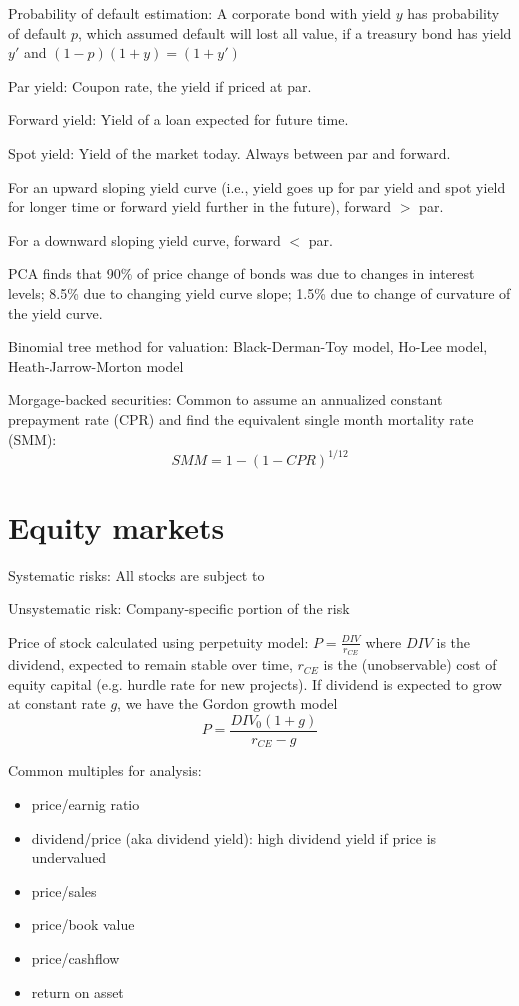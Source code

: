 \documentclass[9pt,twocolumn]{extarticle}
\begin{document}
Probability of default estimation: A corporate bond with yield $y$ has
probability of default $p$, which assumed default will lost all value, if a
treasury bond has yield $y'$ and $(1-p)(1+y) = (1+y')$

Par yield: Coupon rate, the yield if priced at par.

Forward yield: Yield of a loan expected for future time.

Spot yield: Yield of the market today. Always between par and forward.

For an upward sloping yield curve (i.e., yield goes up for par yield and spot
yield for longer time or forward yield further in the future), forward $>$ par.

For a downward sloping yield curve, forward $<$ par.

PCA finds that 90\% of price change of bonds was due to changes in interest
levels; 8.5\% due to changing yield curve slope; 1.5\% due to change of
curvature of the yield curve.

Binomial tree method for valuation: Black-Derman-Toy model, Ho-Lee model, Heath-Jarrow-Morton model

Morgage-backed securities: Common to assume an annualized constant prepayment
rate (CPR) and find the equivalent single month mortality rate (SMM):\[
SMM = 1 - (1-CPR)^{1/12}
\]

\section{Equity markets}
Systematic risks: All stocks are subject to

Unsystematic risk: Company-specific portion of the risk

Price of stock calculated using perpetuity model: $P = \frac{DIV}{r_{CE}}$
where $DIV$ is the dividend, expected to remain stable over time, $r_{CE}$ is the
(unobservable) cost of equity capital (e.g. hurdle rate for new projects). If
dividend is expected to grow at constant rate $g$, we have the Gordon growth
model\[
    P = \frac{DIV_0(1+g)}{r_{CE}-g}
\]

Common multiples for analysis:
\begin{itemize}
\item price/earnig ratio
\item dividend/price (aka dividend yield): high dividend yield if price is
    undervalued
\item price/sales
\item price/book value
\item price/cashflow
\item return on asset
\end{itemize}
\end{document}

